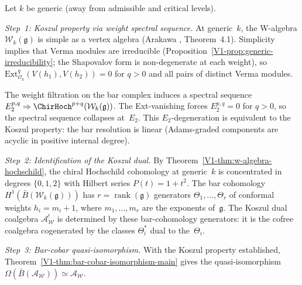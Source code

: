\begin{remark}
Let $k$ be generic (away from admissible and critical levels).

\emph{Step~1: Koszul property via weight spectral sequence.}
At generic~$k$, the W-algebra $\mathcal{W}_k(\mathfrak{g})$ is simple
as a vertex algebra (Arakawa \cite{Ara07}, Theorem~4.1). Simplicity
implies that Verma modules are irreducible
(Proposition~\ref*{V1-prop:generic-irreducibility}; the Shapovalov form
is non-degenerate at each weight), so
$\mathrm{Ext}^q_{\mathcal{O}_k}(V(h_1), V(h_2)) = 0$ for $q > 0$
and all pairs of distinct Verma modules.

The weight filtration on the bar complex induces a spectral sequence
$E_2^{p,q} \Rightarrow \ChirHoch^{p+q}(\mathcal{W}_k(\mathfrak{g}))$.
The Ext-vanishing forces $E_2^{p,q} = 0$ for $q > 0$, so the spectral
sequence collapses at~$E_2$. This $E_2$-degeneration is equivalent to
the Koszul property: the bar resolution is linear
(Adams-graded components are acyclic in positive internal degree).

\emph{Step~2: Identification of the Koszul dual.}
By Theorem~\ref*{V1-thm:w-algebra-hochschild},
the chiral Hochschild cohomology at generic~$k$ is concentrated in
degrees $\{0,1,2\}$ with Hilbert series $P(t) = 1 + t^2$.
The bar cohomology $H^1(\bar{B}(\mathcal{W}_k(\mathfrak{g})))$ has
$r = \operatorname{rank}(\mathfrak{g})$ generators
$\Theta_1, \ldots, \Theta_r$ of conformal weights $h_i = m_i + 1$,
where $m_1, \ldots, m_r$ are the exponents of~$\mathfrak{g}$.
The Koszul dual coalgebra $\mathcal{A}_{\mathcal{W}}^!$ is determined by
these bar-cohomology generators: it is the cofree coalgebra
cogenerated by the classes $\Theta_i^*$ dual to the~$\Theta_i$.

\emph{Step~3: Bar-cobar quasi-isomorphism.}
With the Koszul property established,
Theorem~\ref*{V1-thm:bar-cobar-isomorphism-main} gives the
quasi-isomorphism
$\Omega(\bar{B}(\mathcal{A}_{\mathcal{W}})) \simeq
\mathcal{A}_{\mathcal{W}}$.
\end{remark}


